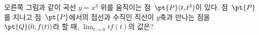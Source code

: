 \noindent\begin{minipage}[t]{0.58\linewidth}\vspace{0pt}\raggedright 오른쪽 그림과 같이 곡선 $y=x^3$ 위를 움직이는 점~$\pt{P}(t{,}\mkern3mu\mathopen{}t^3)$이 있다. 점~$\pt{P}$를 지나고 점~$\pt{P}$에서의 접선과 수직인 직선이 $y$축과 만나는 점을 $\pt{Q}(0{,}\mkern3mu\mathopen{}f(t))$라 할 때, $\displaystyle\lim_{t\to 0}tf(t)$의 값은?\end{minipage}\hfill\begin{minipage}[t]{0.4\linewidth}\vspace{0pt}\centering \resizebox{\ifdim\width>\linewidth\linewidth\else\width\fi}{!}{}\end{minipage}\par
{}
